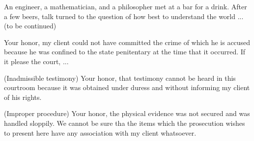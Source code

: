 \begin{joke}
An engineer, a mathematician, and a philosopher met
at a bar for a drink.  After a few beers, talk
turned to the question of how best to understand
the world ... (to be continued)
\end{joke}

\begin{objection}
Your honor, my client could not have committed the
crime of which he is accused because he was
confined to the state penitentary at the time
that it occurred.  If it please the court, ...
\end{objection}
\begin{objection}
{\rm (Inadmissible testimony) }Your honor, that testimony cannot be
heard in this courtroom because it
was obtained under duress and without
informing my client of his rights.
\end{objection}
\begin{objection}
{\rm (Improper procedure) }Your honor, the physical evidence
was not secured and was handled sloppily.
We cannot be sure tha the items which
the prosecution wishes to present here
have any association with my client
whatsoever.
\end{objection}
